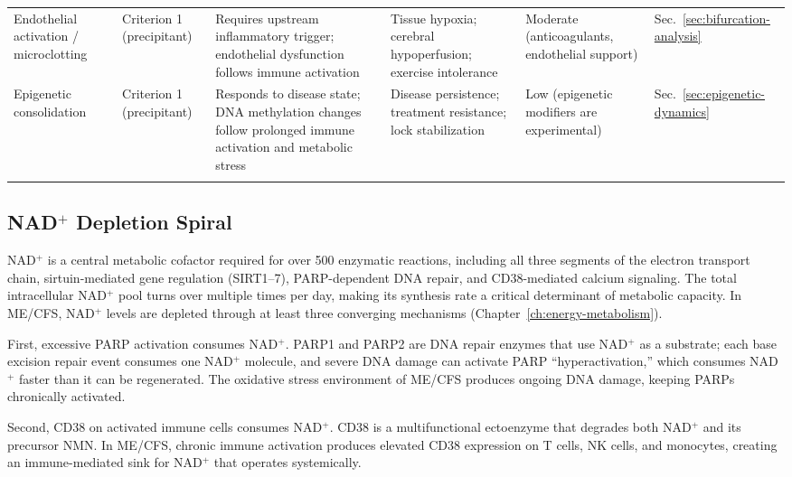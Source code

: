 \begin{landscape}
\begin{longtable}{p{3.0cm}p{2.5cm}p{4.5cm}p{3.5cm}p{2.0cm}p{2.5cm}}
Endothelial activation / microclotting & Criterion 1 (precipitant) & Requires upstream inflammatory trigger; endothelial dysfunction follows immune activation & Tissue hypoxia; cerebral hypoperfusion; exercise intolerance & Moderate (anticoagulants, endothelial support) & Sec.~\ref{sec:bifurcation-analysis} \\
\addlinespace

Epigenetic consolidation & Criterion 1 (precipitant) & Responds to disease state; DNA methylation changes follow prolonged immune activation and metabolic stress & Disease persistence; treatment resistance; lock stabilization & Low (epigenetic modifiers are experimental) & Sec.~\ref{sec:epigenetic-dynamics} \\
\addlinespace

\end{longtable}
\end{landscape}


\subsection{NAD\texorpdfstring{$^+$}{+} Depletion Spiral}
\label{sec:amp-nad}

NAD$^+$ is a central metabolic cofactor required for over 500 enzymatic reactions, including all three segments of the electron transport chain, sirtuin-mediated gene regulation (SIRT1--7), PARP-dependent DNA repair, and CD38-mediated calcium signaling. The total intracellular NAD$^+$ pool turns over multiple times per day, making its synthesis rate a critical determinant of metabolic capacity. In ME/CFS, NAD$^+$ levels are depleted through at least three converging mechanisms (Chapter~\ref{ch:energy-metabolism}).

First, excessive PARP activation consumes NAD$^+$. PARP1 and PARP2 are DNA repair enzymes that use NAD$^+$ as a substrate; each base excision repair event consumes one NAD$^+$ molecule, and severe DNA damage can activate PARP ``hyperactivation,'' which consumes NAD$^+$ faster than it can be regenerated. The oxidative stress environment of ME/CFS produces ongoing DNA damage, keeping PARPs chronically activated.

Second, CD38 on activated immune cells consumes NAD$^+$. CD38 is a multifunctional ectoenzyme that degrades both NAD$^+$ and its precursor NMN. In ME/CFS, chronic immune activation produces elevated CD38 expression on T cells, NK cells, and monocytes, creating an immune-mediated sink for NAD$^+$ that operates systemically.

